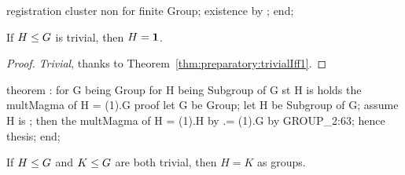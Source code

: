 registration
  cluster non  for finite Group;
  existence by ;
end;

\nwendcode{}\nwdocspar

\begin{theorem}\label{thm:characteristic:preparatory:trivial-subgroups-look-like-1}
If $H\leq G$ is trivial, then $H=\mathbf{1}$.
\end{theorem}

\begin{proof}
\emph{Trivial}, thanks to Theorem~\ref{thm:preparatory:trivialIff1}.
\end{proof}

\nwenddocs{}\endmoddef\nwstartdeflinemarkup{}\nwenddeflinemarkup
theorem :
  for G being Group
  for H being Subgroup of G
  st H is 
  holds the multMagma of H = (1).G
proof
  let G be Group;
  let H be Subgroup of G;
  assume H is ;
  then the multMagma of H = (1).H by 
                         .= (1).G by GROUP_2:63;
  hence thesis;
end;

\eatline
{}\nwendcode{}\nwdocspar
\begin{theorem}
If $H\leq G$ and $K\leq G$ are both trivial, then $H=K$ as groups.
\end{theorem}

